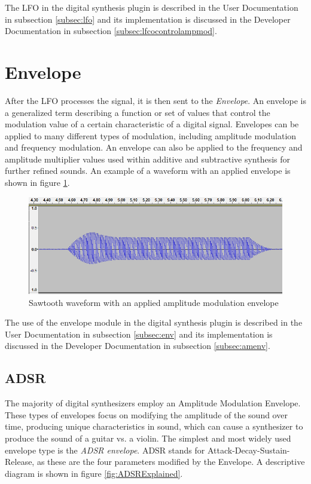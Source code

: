 \documentclass[a4paper,12pt]{report}
\begin{document}
The LFO in the digital synthesis plugin is described in the User Documentation in subsection \ref{subsec:lfo} and its implementation is discussed in the Developer Documentation in subsection \ref{subsec:lfcocontrolampmod}.

\section{Envelope}
\label{sec:env}
After the LFO processes the signal, it is then sent to the \emph{Envelope}. An envelope is a generalized term describing a function or set of values that control the modulation value of a certain characteristic of a digital signal. Envelopes can be applied to many different types of modulation, including amplitude modulation and frequency modulation. An envelope can also be applied to the frequency and amplitude multiplier values used within additive and subtractive synthesis for further refined sounds. An example of a waveform with an applied envelope is shown in figure \ref{fig:ADSRWaveform}.

\begin{figure}[h]
    \centering
    \includegraphics[width=36em]{ADSRWaveform.png}
    \caption{Sawtooth waveform with an applied amplitude modulation envelope \cite{stm32f4}}
    \label{fig:ADSRWaveform}
\end{figure}

The use of the envelope module in the digital synthesis plugin is described in the User Documentation in subsection \ref{subsec:env} and its implementation is discussed in the Developer Documentation in subsection \ref{subsec:amenv}.

\subsection{ADSR}
\label{subsec:adsr}
The majority of digital synthesizers employ an Amplitude Modulation Envelope. These types of envelopes focus on modifying the amplitude of the sound over time, producing unique characteristics in sound, which can cause a synthesizer to produce the sound of a guitar vs. a violin. The simplest and most widely used envelope type is the \emph{ADSR envelope}. ADSR stands for Attack-Decay-Sustain-Release, as these are the four parameters modified by the Envelope. A descriptive diagram is shown in figure \ref{fig:ADSRExplained}.
\end{document}
